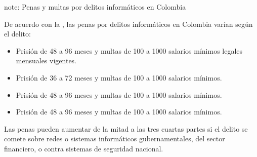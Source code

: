 \documentclass[letterpaper,10pt,spanish]{sphinxmanual}
\begin{document}
\begin{sphinxadmonition}{note}{: Penas y multas por delitos informáticos en Colombia}

\sphinxAtStartPar
De acuerdo con la , las penas por delitos informáticos en Colombia varían según el delito:
\begin{itemize}
\item {} 
\sphinxAtStartPar
{} Prisión de 48 a 96 meses y multas de 100 a 1000 salarios mínimos legales mensuales vigentes.

\item {} 
\sphinxAtStartPar
{} Prisión de 36 a 72 meses y multas de 100 a 1000 salarios mínimos.

\item {} 
\sphinxAtStartPar
{} Prisión de 48 a 96 meses y multas de 100 a 1000 salarios mínimos.

\item {} 
\sphinxAtStartPar
{} Prisión de 48 a 96 meses y multas de 100 a 1000 salarios mínimos.

\end{itemize}

\sphinxAtStartPar
Las penas pueden aumentar de la mitad a las tres cuartas partes si el delito se comete sobre redes o sistemas informáticos gubernamentales, del sector financiero, o contra sistemas de seguridad nacional.
\end{sphinxadmonition}
\end{document}
